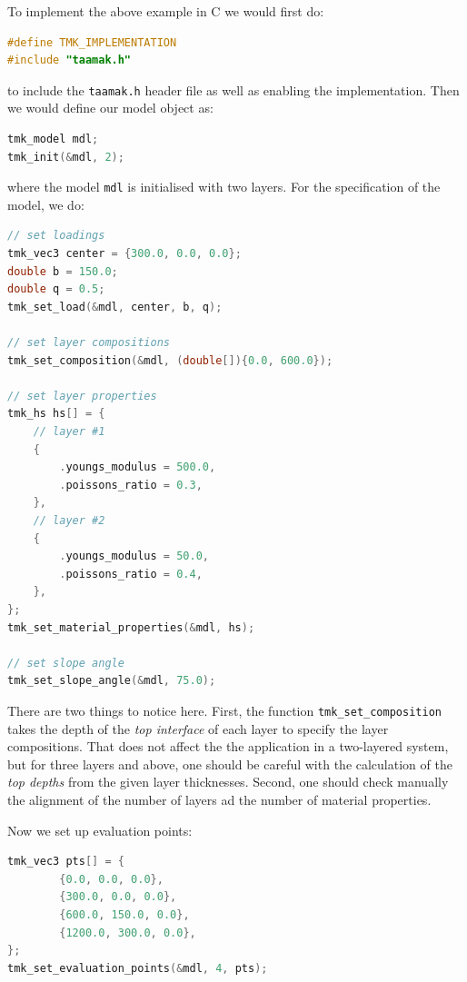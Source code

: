 \documentclass{article}
\newcommand{\tmk}{\texttt{taamak.h}}
\begin{document}
To implement the above example in C we would first do:
\begin{file}[ex\_01.c]
\begin{lstlisting}[language=C]
#define TMK_IMPLEMENTATION
#include "taamak.h"
\end{lstlisting}
\end{file}
to include the \tmk{} header file as well as enabling the implementation. Then we would define our model object as:
\begin{file}[ex\_01.c]
\begin{lstlisting}[language=C]
tmk_model mdl;
tmk_init(&mdl, 2);
\end{lstlisting}
\end{file}
where the model \texttt{mdl} is initialised with two layers. For the specification of the model, we do:
\begin{file}[ex\_01.c]
\begin{lstlisting}[language=C]
// set loadings
tmk_vec3 center = {300.0, 0.0, 0.0};
double b = 150.0;
double q = 0.5;
tmk_set_load(&mdl, center, b, q);

// set layer compositions
tmk_set_composition(&mdl, (double[]){0.0, 600.0});

// set layer properties
tmk_hs hs[] = {
    // layer #1
    {
        .youngs_modulus = 500.0,
        .poissons_ratio = 0.3,
    },
    // layer #2
    {
        .youngs_modulus = 50.0,
        .poissons_ratio = 0.4,
    },
};
tmk_set_material_properties(&mdl, hs);

// set slope angle
tmk_set_slope_angle(&mdl, 75.0);
\end{lstlisting}
\end{file}

There are two things to notice here. First, the function \texttt{tmk\_set\_composition} takes the depth of the \textit{top interface} of each layer to specify the layer compositions. That does not affect the the application in a two-layered system, but for three layers and above, one should be careful with the calculation of the \textit{top depths} from the given layer thicknesses. Second, one should check manually the alignment of the number of layers ad the number of material properties. 

Now we set up evaluation points:
\begin{file}[ex\_01.c]
\begin{lstlisting}[language=C]
tmk_vec3 pts[] = {
        {0.0, 0.0, 0.0},
        {300.0, 0.0, 0.0},
        {600.0, 150.0, 0.0},
        {1200.0, 300.0, 0.0},
};
tmk_set_evaluation_points(&mdl, 4, pts);
\end{lstlisting}
\end{file}
\end{document}
